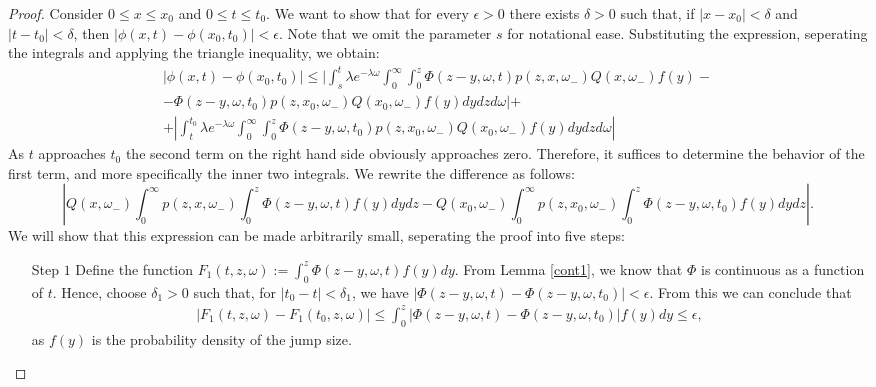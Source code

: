 \documentclass[11pt,reqno]{article}
\theoremstyle{definition}
\begin{document}
\begin{proof}
	Consider $0 \leq x \leq x_0$ and $0 \leq t \leq t_0$. We want to show that for every $\epsilon >0 $ there exists $\delta>0$ such that, if $|x-x_0| < \delta$ and $|t-t_0| < \delta$, then $|\phi(x,t)-\phi(x_0,t_0)| <\epsilon$. Note that we omit the parameter $s$ for notational ease. Substituting the expression, seperating the integrals and applying the triangle inequality, we obtain:
	\begin{eqnarray}
		|\phi(x,t)-\phi(x_0,t_0)| \leq |\int_{s}^{t} \lambda e^{-\lambda \omega} \int_{0}^{\infty} \int_{0}^{z} \Phi(z-y,\omega,t) p(z,x,\omega_-) Q(x,\omega_-)f(y)   - \nonumber \\
		-   \Phi(z-y,\omega,t_0) p(z,x_0,\omega_-) Q(x_0,\omega_-)f(y)dydzd\omega| + \nonumber\\+ |\int_{t}^{t_0} \lambda e^{-\lambda \omega} \int_{0}^{\infty} \int_{0}^{z} \Phi(z-y,\omega,t_0) p(z,x_0,\omega_-) Q(x_0,\omega_-)f(y) dydzd\omega|
	\end{eqnarray}
	As $t$ approaches $t_0$ the second term on the right hand side obviously approaches zero. Therefore, it suffices to determine the behavior of the first term, and more specifically the inner two integrals. We rewrite the difference as follows:
	$$| Q(x,\omega_-)\int_{0}^{\infty} p(z,x,\omega_-)\int_{0}^{z}\Phi(z-y,\omega,t) f(y)dydz -Q(x_0,\omega_-)\int_{0}^{\infty} p(z,x_0,\omega_-)\int_{0}^{z}\Phi(z-y,\omega,t_0)f(y)dydz |.$$
	We will show that this expression can be made arbitrarily small, seperating the proof into five steps:
	\begin{itemize}
		\item[Step $1$] Define the function $F_1(t,z,\omega):= \int_{0}^{z} \Phi(z-y,\omega,t)f(y)dy$. From Lemma \ref{cont1}, we know that $\Phi$ is continuous as a function of $t$. Hence, choose $\delta_1 >0$ such that, for $|t_0-t| < \delta_1$, we have $|\Phi(z-y,\omega,t)-\Phi(z-y,\omega,t_0)| < \epsilon$. From this we can conclude that 
		\begin{eqnarray}
			|F_1(t, z,\omega)-F_1(t_0,z,\omega)| \leq \int_{0}^{z} |\Phi(z-y,\omega,t)-\Phi(z-y,\omega,t_0)|f(y)dy \leq \epsilon,
		\end{eqnarray}
		as $f(y)$ is the probability density of the jump size.
		

\end{itemize}
\end{proof}
\end{document}
